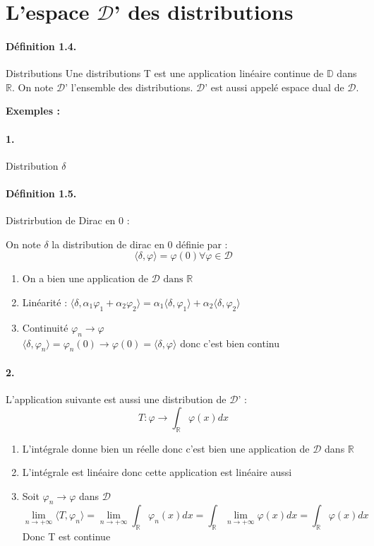 \documentclass[12pt,a4paper]{report}
\newcommand{\Ens}[1]{\mathbb{#1}}
\newcommand{\ens}[1]{\mathbb{#1}}
\newcommand{\D}{\ensuremath{\mathcal{D}}}
\begin{document}
\section{L'espace \D' des distributions}

\paragraph{Définition 1.4.} Distributions
Une distributions T est une application linéaire continue de \(\mathbb{D}\) dans \(\mathbb{R}\).
On note \D' l'ensemble des distributions. \D' est aussi appelé espace dual de \D.

\textbf{Exemples :}

\paragraph{1.} Distribution \(\delta\)
\paragraph{Définition 1.5.} Distrirbution de Dirac en 0 :

On note \(\delta\) la distribution de dirac en 0 définie par :
\[
	\langle \delta, \varphi \rangle = \varphi(0) \forall \varphi \in \D
\]

\begin{enumerate}
	\item On a bien une application de \(\D \text{ dans } \mathbb{R}\)
	\item Linéarité : \(\langle \delta, \alpha_1 \varphi_1 + 	\alpha_2 \varphi_2 \rangle = \alpha_1 \langle \delta, \varphi_1 \rangle + \alpha_2 \langle \delta, \varphi_2 \rangle\)
	\item Continuité \(\varphi_n \rightarrow \varphi\)\\
	\(\langle \delta, \varphi_n \rangle = \varphi_n (0) \rightarrow \varphi(0) = \langle \delta, \varphi \rangle\) donc c'est bien continu 
\end{enumerate}

\paragraph{2.} L'application suivante est aussi une distribution de \D' :
\[
	T : \varphi \rightarrow \int_{\Ens{R}} \varphi(x) dx
\]
\begin{enumerate}
	\item L'intégrale donne bien un réelle donc c'est bien une application de \(\D\) dans \(\Ens{R}\)
	\item L'intégrale est linéaire donc cette application est linéaire aussi
	\item Soit \(\varphi_n \rightarrow \varphi\) dans \D
	\[
		\lim_{n \rightarrow +\infty} \langle T, \varphi_n \rangle = \lim_{n \rightarrow +\infty} \int_{\ens{R}} \varphi_n (x) dx = \int_{\ens{R}} \lim_{n \rightarrow +\infty} \varphi (x) dx = \int_{\ens{R}} \varphi(x) dx
	\]
	Donc T est continue
\end{enumerate}
\end{document}
